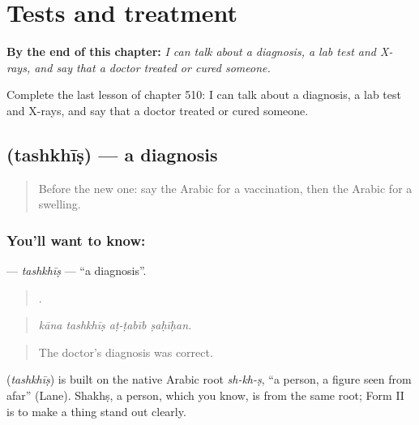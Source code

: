 
\chapter{Tests and treatment}
\label{ch:ar-tests-and-treatment}

\begin{chapteropening}
\textbf{By the end of this chapter:} \emph{I can talk about a diagnosis, a lab test and X-rays, and say that a doctor treated or cured someone.}

Complete the last lesson of chapter 510: I can talk about a diagnosis, a lab test and X-rays, and say that a doctor treated or cured someone.
\end{chapteropening}

\section[\texorpdfstring{\ar{تشخيص} (tashkhīṣ)}{تشخيص (tashkhīṣ)}]{ (tashkhīṣ) — a diagnosis}

\label{lesson:AR-C510-tashkhis}



\begin{quote}
Before the new one: say the Arabic for a vaccination, then the Arabic for a swelling.
\end{quote}

\subsection*{You'll want to know: }
\textbf{} — \emph{tashkhīṣ} — \textquotedblleft{}a diagnosis\textquotedblright{}.

\begin{quote}
   .
\end{quote}

\begin{quote}
\emph{kāna tashkhīṣ aṭ-ṭabīb ṣaḥīḥan.}
\end{quote}

\begin{quote}
The doctor's diagnosis was correct.
\end{quote}

\begin{cousinweb}
\textbf{} (\emph{tashkhīṣ}) is built on the native Arabic root \emph{sh-kh-ṣ}, \textquotedblleft{}a person, a figure seen from afar\textquotedblright{} (Lane). Shakhṣ, a person, which you know, is from the same root; Form II is to make a thing stand out clearly.
\end{cousinweb}

